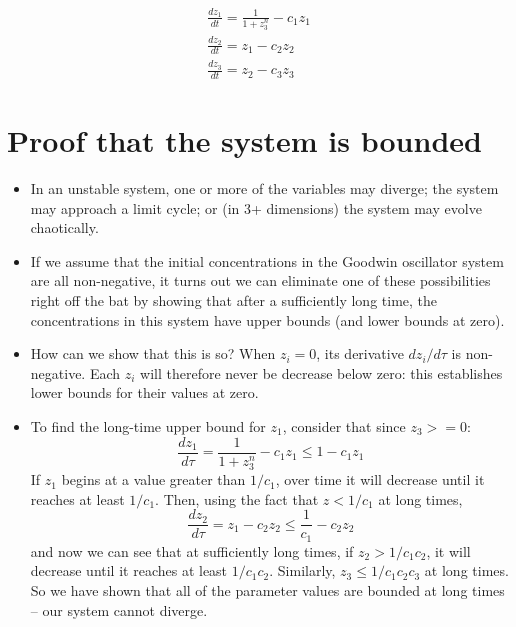 \documentclass{article}
\begin{document}
\begin{itemize}
\begin{eqnarray*}
\frac{dz_1}{dt} = \frac{1}{1 + z_3^n} - c_1 z_1\\
\frac{dz_2}{dt} = z_1 - c_2 z_2\\
\frac{dz_3}{dt} = z_2 -c_3 z_3
\end{eqnarray*}

\end{itemize}

\section*{Proof that the system is bounded}

\begin{itemize}
\item In an unstable system, one or more of the variables may diverge; the system may approach a limit cycle; or (in 3+ dimensions) the system may evolve chaotically.
\item If we assume that the initial concentrations in the Goodwin oscillator system are all non-negative, it turns out we can eliminate one of these possibilities right off the bat by showing that after a sufficiently long time, the concentrations in this system have upper bounds (and lower bounds at zero).

\item How can we show that this is so? When $z_i = 0$, its derivative $dz_i/d\tau$ is non-negative. Each $z_i$ will therefore never be decrease below zero: this establishes lower bounds for their values at zero.

\item To find the long-time upper bound for $z_1$, consider that since $z_3 >= 0$:
\[ \frac{dz_1}{d\tau} = \frac{1}{1 + z_3^n} -  c_1 z_1 \leq 1 - c_1 z_1\]
If $z_1$ begins at a value greater than $1/c_1$, over time it will decrease until it reaches at least $1/c_1$. Then, using the fact that $z < 1/c_1$ at long times,
\[ \frac{dz_2}{d\tau} = z_1 -  c_2 z_2 \leq \frac{1}{c_1}  - c_2 z_2\]
and now we can see that at sufficiently long times, if $z_2 > 1/c_1c_2$, it will decrease until it reaches at least $1/c_1c_2$. Similarly, $z_3 \leq 1/c_1c_2c_3$ at long times. So we have shown that all of the parameter values are bounded at long times -- our system cannot diverge.\\


\end{itemize}
\end{document}
